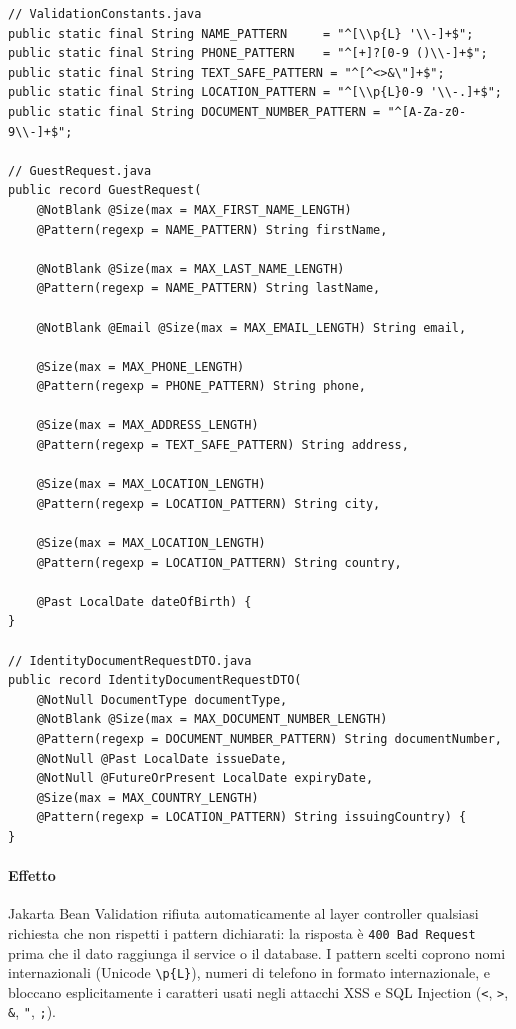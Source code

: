 ﻿\documentclass[a4paper,12pt]{report}
\begin{document}
\begin{securebox}[title={Codice Sicuro --- GuestRequest.java + ValidationConstants.java}]
\begin{lstlisting}[style=java]
// ValidationConstants.java
public static final String NAME_PATTERN     = "^[\\p{L} '\\-]+$";
public static final String PHONE_PATTERN    = "^[+]?[0-9 ()\\-]+$";
public static final String TEXT_SAFE_PATTERN = "^[^<>&\"]+$";
public static final String LOCATION_PATTERN = "^[\\p{L}0-9 '\\-.]+$";
public static final String DOCUMENT_NUMBER_PATTERN = "^[A-Za-z0-9\\-]+$";

// GuestRequest.java
public record GuestRequest(
    @NotBlank @Size(max = MAX_FIRST_NAME_LENGTH)
    @Pattern(regexp = NAME_PATTERN) String firstName,

    @NotBlank @Size(max = MAX_LAST_NAME_LENGTH)
    @Pattern(regexp = NAME_PATTERN) String lastName,

    @NotBlank @Email @Size(max = MAX_EMAIL_LENGTH) String email,

    @Size(max = MAX_PHONE_LENGTH)
    @Pattern(regexp = PHONE_PATTERN) String phone,

    @Size(max = MAX_ADDRESS_LENGTH)
    @Pattern(regexp = TEXT_SAFE_PATTERN) String address,

    @Size(max = MAX_LOCATION_LENGTH)
    @Pattern(regexp = LOCATION_PATTERN) String city,

    @Size(max = MAX_LOCATION_LENGTH)
    @Pattern(regexp = LOCATION_PATTERN) String country,

    @Past LocalDate dateOfBirth) {
}

// IdentityDocumentRequestDTO.java
public record IdentityDocumentRequestDTO(
    @NotNull DocumentType documentType,
    @NotBlank @Size(max = MAX_DOCUMENT_NUMBER_LENGTH)
    @Pattern(regexp = DOCUMENT_NUMBER_PATTERN) String documentNumber,
    @NotNull @Past LocalDate issueDate,
    @NotNull @FutureOrPresent LocalDate expiryDate,
    @Size(max = MAX_COUNTRY_LENGTH)
    @Pattern(regexp = LOCATION_PATTERN) String issuingCountry) {
}
\end{lstlisting}
\end{securebox}

\paragraph{Effetto}
Jakarta Bean Validation rifiuta automaticamente al layer controller qualsiasi
richiesta che non rispetti i pattern dichiarati: la risposta è
\texttt{400 Bad Request} prima che il dato raggiunga il service o il database.
I pattern scelti coprono nomi internazionali (Unicode \texttt{\textbackslash p\{L\}}),
numeri di telefono in formato internazionale, e bloccano esplicitamente i caratteri
usati negli attacchi XSS e SQL Injection (\texttt{<}, \texttt{>}, \texttt{\&},
\texttt{"}, \texttt{;}).
\end{document}
